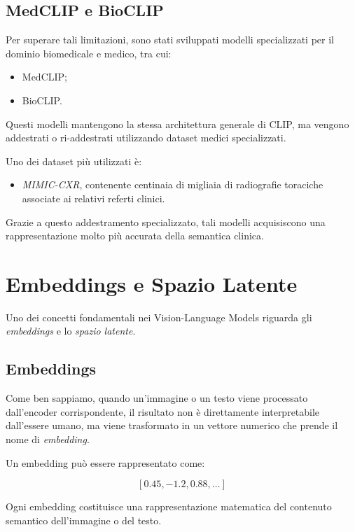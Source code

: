 \subsection{MedCLIP e BioCLIP}

Per superare tali limitazioni, sono stati sviluppati modelli specializzati per il dominio biomedicale e medico, tra cui:

\begin{itemize}
    \item MedCLIP;
    \item BioCLIP.
\end{itemize}

Questi modelli mantengono la stessa architettura generale di CLIP, ma vengono addestrati o ri-addestrati utilizzando dataset medici specializzati.

Uno dei dataset più utilizzati è:

\begin{itemize}
    \item \textit{MIMIC-CXR}, contenente centinaia di migliaia di radiografie toraciche associate ai relativi referti clinici.
\end{itemize}

Grazie a questo addestramento specializzato, tali modelli acquisiscono una rappresentazione molto più accurata della semantica clinica.

\section{Embeddings e Spazio Latente}

Uno dei concetti fondamentali nei Vision-Language Models riguarda gli \textit{embeddings} e lo \textit{spazio latente}.

\subsection{Embeddings}

Come ben sappiamo, quando un'immagine o un testo viene processato dall'encoder corrispondente, il risultato non è direttamente interpretabile dall'essere umano, ma viene trasformato in un vettore numerico che prende il nome di \textit{embedding}.

Un embedding può essere rappresentato come:

\[
[0.45, -1.2, 0.88, \dots]
\]

Ogni embedding costituisce una rappresentazione matematica del contenuto semantico dell'immagine o del testo.

